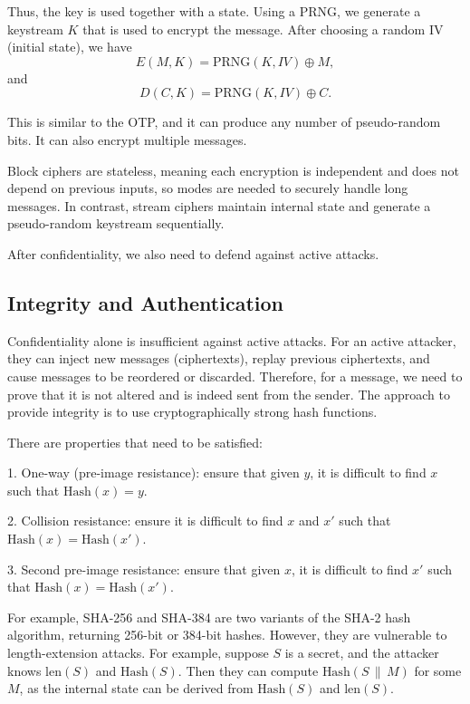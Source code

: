 Thus, the key is used together with a state. Using a PRNG, we generate a keystream \(K\) that is used to encrypt the message. After choosing a random IV (initial state), we have
\[
  E(M, K) = \text{PRNG}(K, IV) \oplus M,
\]
and
\[
  D(C, K) = \text{PRNG}(K, IV) \oplus C.
\]

This is similar to the OTP, and it can produce any number of pseudo-random bits. It can also encrypt multiple messages.

\begin{remark}
  Block ciphers are stateless, meaning each encryption is independent and does not depend on previous inputs, so modes are needed to securely handle long messages. In contrast, stream ciphers maintain internal state and generate a pseudo-random keystream sequentially.
\end{remark}

After confidentiality, we also need to defend against active attacks.

\subsection{Integrity and Authentication}
Confidentiality alone is insufficient against active attacks. For an active attacker, they can inject new messages (ciphertexts), replay previous ciphertexts, and cause messages to be reordered or discarded. Therefore, for a message, we need to prove that it is not altered and is indeed sent from the sender. The approach to provide integrity is to use cryptographically strong hash functions.

There are properties that need to be satisfied:

1. One-way (pre-image resistance): ensure that given \(y\), it is difficult to find \(x\) such that \(\text{Hash}(x) = y\).

2. Collision resistance: ensure it is difficult to find \(x\) and \(x'\) such that \(\text{Hash}(x) = \text{Hash}(x')\).

3. Second pre-image resistance: ensure that given \(x\), it is difficult to find \(x'\) such that \(\text{Hash}(x) = \text{Hash}(x')\).

For example, SHA-256 and SHA-384 are two variants of the SHA-2 hash algorithm, returning 256-bit or 384-bit hashes. However, they are vulnerable to length-extension attacks. For example, suppose \(S\) is a secret, and the attacker knows \(\text{len}(S)\) and \(\text{Hash}(S)\). Then they can compute \(\text{Hash}(S \,\|\, M)\) for some \(M\), as the internal state can be derived from \(\text{Hash}(S)\) and \(\text{len}(S)\).

